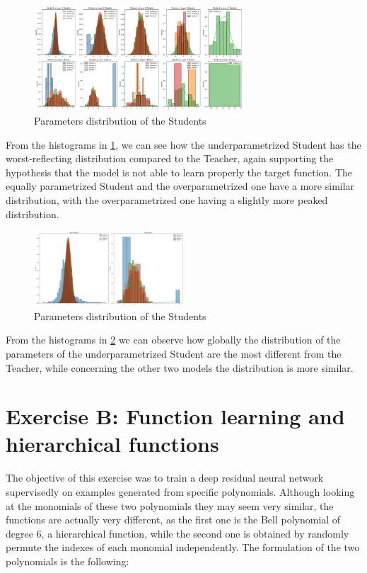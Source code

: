 \documentclass[a4paper, 10pt]{article}
\begin{document}
\begin{figure}[h]
    \centering
    \includegraphics[width=0.7\textwidth]{images/weights_biases_histograms_layers_exA.png}
    \caption{Parameters distribution of the Students}
    \label{fig:weights_biases_histograms_layers_exA}
\end{figure}

From the histograms in \ref{fig:weights_biases_histograms_layers_exA}, we can see how the underparametrized Student has the worst-reflecting distribution compared to the Teacher, again supporting the 
hypothesis that the model is not able to learn properly the target function. The equally parametrized Student and the overparametrized one have a more similar
distribution, with the overparametrized one having a slightly more peaked distribution.

\begin{figure}[h]
    \centering
    \includegraphics[width=0.5\textwidth]{images/weights_biases_histograms_global_exA.png}
    \caption{Parameters distribution of the Students}
    \label{fig:weights_biases_histograms_global_exA}
\end{figure}

From the histograms in \ref{fig:weights_biases_histograms_global_exA} we can observe how globally the distribution of the parameters of the underparametrized Student
are the most different from the Teacher, while concerning the other two models the distribution is more similar.


\section{Exercise B: Function learning and hierarchical functions}
The objective of this exercise was to train a deep residual neural network supervisedly on examples generated from specific polynomials. Although looking at the
monomials of these two polynomials they may seem very similar, the functions are actually very different, as the first one is the Bell polynomial of degree 6,
a hierarchical function, while the second one is obtained by randomly permute the indexes of each monomial independently. The formulation of the two polynomials is
the following:
\end{document}
